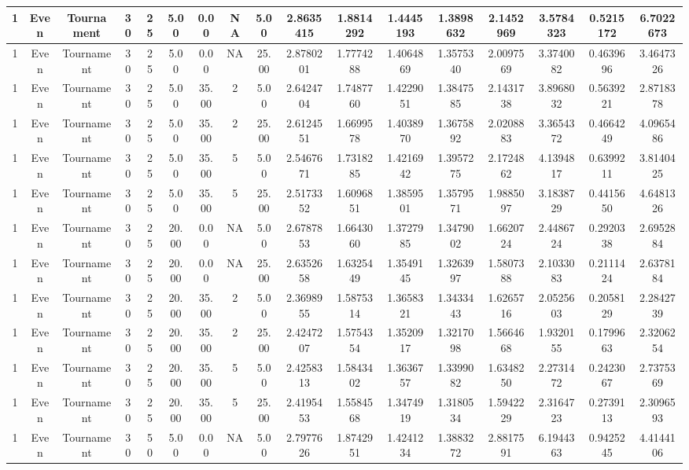 \documentclass[a4paper]{article}
\begin{document}
\begin{center}
\begin{tabular}{ | c | c | c | c | c | c | c | c | c | c | c | c | c | c | c | c | c | }
		\hline
		1	&	Even	&	Tournament	&	30	&	25	&	5.00	&	0.00	&	NA	&	5.00	&	2.8635415	&	1.8814292	&	1.4445193	&	1.3898632	&	2.1452969	&	3.5784323	&	0.5215172	&	6.7022673 \\
		\hline
		1	&	Even	&	Tournament	&	30	&	25	&	5.00	&	0.00	&	NA	&	25.00	&	2.8780201	&	1.7774288	&	1.4064869	&	1.3575340	&	2.0097569	&	3.3740082	&	0.4639696	&	3.4647326 \\
		\hline
		1	&	Even	&	Tournament	&	30	&	25	&	5.00	&	35.00	&	2	&	5.00	&	2.6424704	&	1.7487760	&	1.4229051	&	1.3847585	&	2.1431738	&	3.8968032	&	0.5639221	&	2.8718378 \\
		\hline
		1	&	Even	&	Tournament	&	30	&	25	&	5.00	&	35.00	&	2	&	25.00	&	2.6124551	&	1.6699578	&	1.4038970	&	1.3675892	&	2.0208883	&	3.3654372	&	0.4664249	&	4.0965486 \\
		\hline
		1	&	Even	&	Tournament	&	30	&	25	&	5.00	&	35.00	&	5	&	5.00	&	2.5467671	&	1.7318285	&	1.4216942	&	1.3957275	&	2.1724862	&	4.1394817	&	0.6399211	&	3.8140425 \\
		\hline
		1	&	Even	&	Tournament	&	30	&	25	&	5.00	&	35.00	&	5	&	25.00	&	2.5173352	&	1.6096851	&	1.3859501	&	1.3579571	&	1.9885097	&	3.1838729	&	0.4415650	&	4.6481326 \\
		\hline
		1	&	Even	&	Tournament	&	30	&	25	&	20.00	&	0.00	&	NA	&	5.00	&	2.6787853	&	1.6643060	&	1.3727985	&	1.3479002	&	1.6620724	&	2.4486724	&	0.2920338	&	2.6952884 \\
		\hline
		1	&	Even	&	Tournament	&	30	&	25	&	20.00	&	0.00	&	NA	&	25.00	&	2.6352658	&	1.6325449	&	1.3549145	&	1.3263997	&	1.5807388	&	2.1033083	&	0.2111424	&	2.6378184 \\
		\hline
		1	&	Even	&	Tournament	&	30	&	25	&	20.00	&	35.00	&	2	&	5.00	&	2.3698955	&	1.5875314	&	1.3658321	&	1.3433443	&	1.6265716	&	2.0525603	&	0.2058129	&	2.2842739 \\
		\hline
		1	&	Even	&	Tournament	&	30	&	25	&	20.00	&	35.00	&	2	&	25.00	&	2.4247207	&	1.5754354	&	1.3520917	&	1.3217098	&	1.5664668	&	1.9320155	&	0.1799663	&	2.3206254 \\
		\hline
		1	&	Even	&	Tournament	&	30	&	25	&	20.00	&	35.00	&	5	&	5.00	&	2.4258313	&	1.5843402	&	1.3636757	&	1.3399082	&	1.6348250	&	2.2731472	&	0.2423067	&	2.7375369 \\
		\hline
		1	&	Even	&	Tournament	&	30	&	25	&	20.00	&	35.00	&	5	&	25.00	&	2.4195453	&	1.5584568	&	1.3474919	&	1.3180534	&	1.5942229	&	2.3164723	&	0.2739113	&	2.3096593 \\
		\hline
		1	&	Even	&	Tournament	&	30	&	50	&	5.00	&	0.00	&	NA	&	5.00	&	2.7977626	&	1.8742951	&	1.4241234	&	1.3883272	&	2.8817591	&	6.1944363	&	0.9425245	&	4.4144106 \\

\end{tabular}
\end{center}
\end{document}
